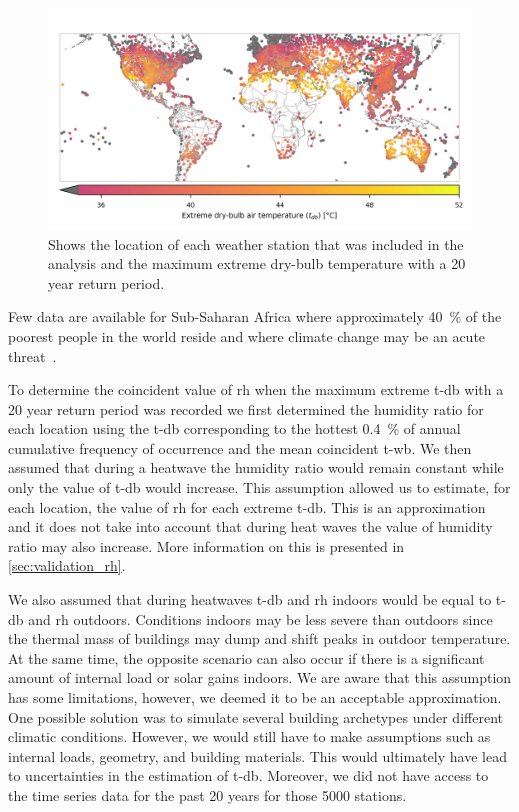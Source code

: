 \begin{figure}[hbt!]
    \centering
    \includegraphics[width=\textwidth]{figures/world-map}
    \caption{Shows the location of each weather station that was included in the analysis and the maximum extreme dry-bulb temperature with a 20 year return period.}
    \label{fig:world-map}
\end{figure}

Few data are available for Sub-Saharan Africa where approximately 40~\% of the poorest people in the world reside and where climate change may be an acute threat~\cite{PovertyO1:online}.

To determine the coincident value of \ac{rh} when the maximum extreme \ac{t-db} with a 20 year return period was recorded we first determined the humidity ratio for each location using the \ac{t-db} corresponding to the hottest 0.4~\% of annual cumulative frequency of occurrence and the mean coincident \ac{t-wb}.
We then assumed that during a heatwave the humidity ratio would remain constant while only the value of \ac{t-db} would increase.
This assumption allowed us to estimate, for each location, the value of \ac{rh} for each extreme \ac{t-db}.
This is an approximation and it does not take into account that during heat waves the value of humidity ratio may also increase.
More information on this is presented in \ref{sec:validation_rh}.

We also assumed that during heatwaves \ac{t-db} and \ac{rh} indoors would be equal to \ac{t-db} and \ac{rh} outdoors.
Conditions indoors may be less severe than outdoors since the thermal mass of buildings may dump and shift peaks in outdoor temperature.
At the same time, the opposite scenario can also occur if there is a significant amount of internal load or solar gains indoors.
We are aware that this assumption has some limitations, however, we deemed it to be an acceptable approximation.
One possible solution was to simulate several building archetypes under different climatic conditions.
However, we would still have to make assumptions such as internal loads, geometry, and building materials.
This would ultimately have lead to uncertainties in the estimation of \ac{t-db}.
Moreover, we did not have access to the time series data for the past 20 years for those 5000 stations.

